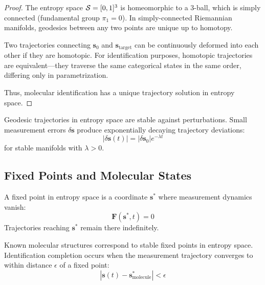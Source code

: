 \begin{proof}
The entropy space $\mathcal{S} = [0,1]^3$ is homeomorphic to a 3-ball, which is simply connected (fundamental group $\pi_1 = 0$). In simply-connected Riemannian manifolds, geodesics between any two points are unique up to homotopy.

Two trajectories connecting $\mathbf{s}_0$ and $\mathbf{s}_{\text{target}}$ can be continuously deformed into each other if they are homotopic. For identification purposes, homotopic trajectories are equivalent—they traverse the same categorical states in the same order, differing only in parametrization.

Thus, molecular identification has a unique trajectory solution in entropy space.
\end{proof}

\begin{proposition}
\label{prop:trajectory_stability}
Geodesic trajectories in entropy space are stable against perturbations. Small measurement errors $\delta\mathbf{s}$ produce exponentially decaying trajectory deviations:
\begin{equation}
|\delta\mathbf{s}(t)| = |\delta\mathbf{s}_0| e^{-\lambda t}
\end{equation}
for stable manifolds with $\lambda > 0$.
\end{proposition}

\subsection{Fixed Points and Molecular States}

\begin{definition}
\label{def:fixed_point}
A fixed point in entropy space is a coordinate $\mathbf{s}^*$ where measurement dynamics vanish:
\begin{equation}
\mathbf{F}(\mathbf{s}^*, t) = 0
\end{equation}
Trajectories reaching $\mathbf{s}^*$ remain there indefinitely.
\end{definition}

\begin{theorem}
\label{thm:molecular_fixed_point}
Known molecular structures correspond to stable fixed points in entropy space. Identification completion occurs when the measurement trajectory converges to within distance $\epsilon$ of a fixed point:
\begin{equation}
|\mathbf{s}(t) - \mathbf{s}^*_{\text{molecule}}| < \epsilon
\end{equation}
\end{theorem}


